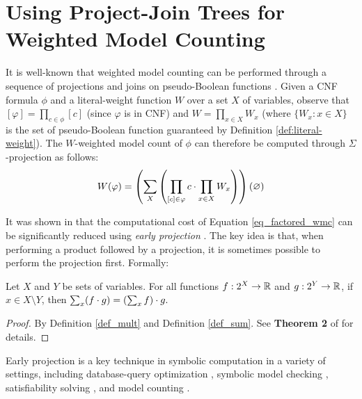 \section{Using Project-Join Trees for Weighted Model Counting}
\label{sec_jointree}


It is well-known that weighted model counting can be performed through a sequence of projections and joins on pseudo-Boolean functions \cite{DPV20}.
Given a CNF formula $\phi$ and a literal-weight function $W$ over a set $X$ of variables, observe that 
$[\varphi] = \prod_{c \in \phi} [c]$ (since $\varphi$ is in CNF) and $W = \prod_{x \in X} W_x$ (where $\{W_x : x \in X\}$ is the set of pseudo-Boolean function guaranteed by Definition \ref{def:literal-weight}). The $W$-weighted model count of $\phi$ can therefore be computed through $\Sigma$-projection as follows:
\begin{equation}
\label{eq_factored_wmc}
    W(\varphi) = \left( 
        \sum_X
        \left( \prod_{[c] \in \varphi} c \cdot \prod_{x \in X} W_x \right)
     \right)(\varnothing)
\end{equation}

It was shown in \cite{DPV20} that the computational cost of Equation \ref{eq_factored_wmc} can be significantly reduced using \emph{early projection} \cite{MPPV04}. The key idea is that, when performing a product followed by a projection, it is sometimes possible to perform the projection first. Formally:
\begin{theorem}
\label{thm_early_proj}
    Let $X$ and $Y$ be sets of variables.
    For all functions $f: 2^X \to \mathbb{R}$ and $g: 2^Y \to \mathbb{R}$, if $x \in X \setminus Y$, then $\sum_x (f \cdot g) = \left( \sum_x f \right) \cdot g.$
\end{theorem}
\begin{proof}
    By Definition \ref{def_mult} and Definition \ref{def_sum}. See \textbf{Theorem 2} of \cite{DPV20} for details.
\end{proof}

Early projection is a key technique in symbolic computation in a variety of settings, including database-query optimization \cite{KV00}, symbolic model checking \cite{burch1991symbolic}, satisfiability solving \cite{pan2005symbolic}, and model counting \cite{DPV20}.

